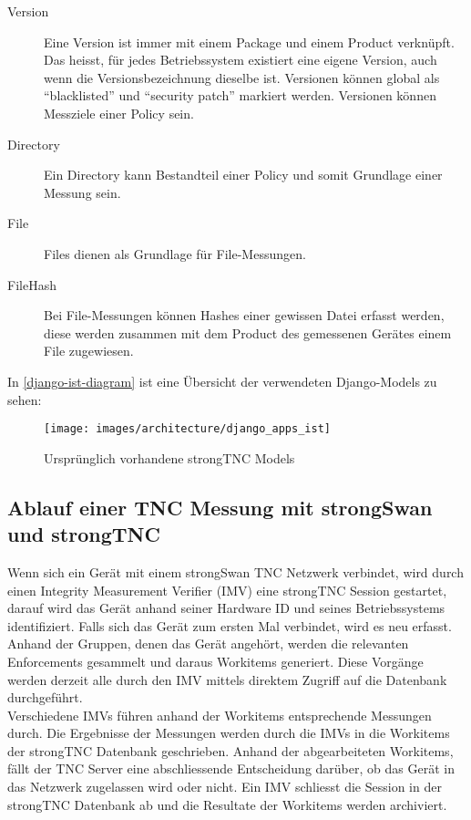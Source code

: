 \begin{description}
	\item[Version] Eine Version ist immer mit einem Package und einem Product
	verknüpft. Das heisst, für jedes Betriebssystem existiert eine eigene Version,
	auch wenn die Versionsbezeichnung dieselbe ist. Versionen können global als
	\enquote{blacklisted} und \enquote{security patch} markiert werden. Versionen
	können Messziele einer Policy sein.

	\item[Directory] Ein Directory kann Bestandteil einer Policy und somit
	Grundlage einer Messung sein.

	\item[File] Files dienen als Grundlage für File-Messungen.

	\item[FileHash] Bei File-Messungen können Hashes einer gewissen Datei erfasst
	werden, diese werden zusammen mit dem Product des gemessenen Gerätes einem
	File zugewiesen.
	
\end{description}

In \autoref{django-ist-diagram} ist eine Übersicht der verwendeten Django-Models
zu sehen:
\begin{figure}[H]
	\centering
	\texttt{[image: images/architecture/django\_apps\_ist]}
	\caption{Ursprünglich vorhandene strongTNC Models}
	\label{django-ist-diagram}
\end{figure}

\subsection{Ablauf einer TNC Messung mit strongSwan und strongTNC}

Wenn sich ein Gerät mit einem strongSwan TNC Netzwerk verbindet, wird durch
einen Integrity Measurement Verifier (IMV) eine strongTNC Session gestartet,
darauf wird das Gerät anhand seiner Hardware ID und seines Betriebssystems
identifiziert. Falls sich das Gerät zum ersten Mal verbindet, wird es neu
erfasst. Anhand der Gruppen, denen das Gerät angehört, werden die relevanten
Enforcements gesammelt und daraus Workitems generiert. Diese Vorgänge werden
derzeit alle durch den IMV mittels direktem Zugriff auf die Datenbank
durchgeführt.\\
Verschiedene IMVs führen anhand der Workitems entsprechende Messungen durch. Die
Ergebnisse der Messungen werden durch die IMVs in die Workitems der strongTNC
Datenbank geschrieben. Anhand der abgearbeiteten Workitems, fällt der TNC Server
eine abschliessende Entscheidung darüber, ob das Gerät in das Netzwerk
zugelassen wird oder nicht. Ein IMV schliesst die Session in der strongTNC
Datenbank ab und die Resultate der Workitems werden archiviert.\\

